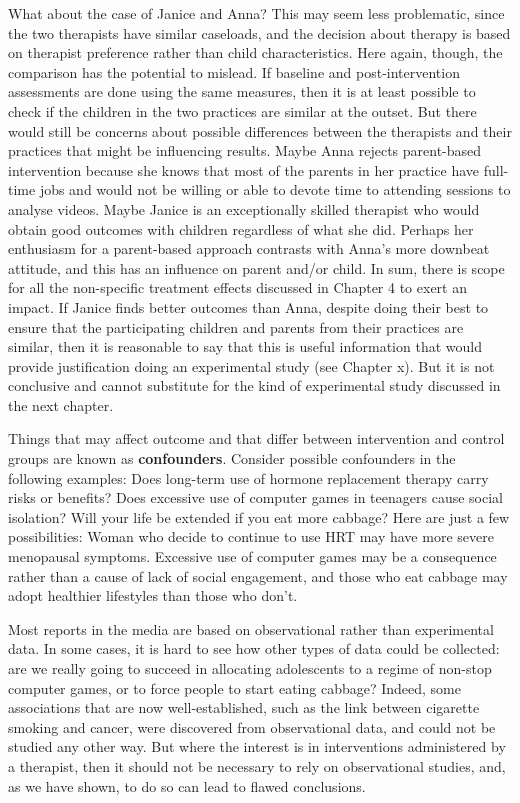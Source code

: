 \documentclass[]{book}
\begin{document}
What about the case of Janice and Anna? This may seem less problematic, since the two therapists have similar caseloads, and the decision about therapy is based on therapist preference rather than child characteristics. Here again, though, the comparison has the potential to mislead. If baseline and post-intervention assessments are done using the same measures, then it is at least possible to check if the children in the two practices are similar at the outset. But there would still be concerns about possible differences between the therapists and their practices that might be influencing results. Maybe Anna rejects parent-based intervention because she knows that most of the parents in her practice have full-time jobs and would not be willing or able to devote time to attending sessions to analyse videos. Maybe Janice is an exceptionally skilled therapist who would obtain good outcomes with children regardless of what she did. Perhaps her enthusiasm for a parent-based approach contrasts with Anna's more downbeat attitude, and this has an influence on parent and/or child. In sum, there is scope for all the non-specific treatment effects discussed in Chapter 4 to exert an impact. If Janice finds better outcomes than Anna, despite doing their best to ensure that the participating children and parents from their practices are similar, then it is reasonable to say that this is useful information that would provide justification doing an experimental study (see Chapter x). But it is not conclusive and cannot substitute for the kind of experimental study discussed in the next chapter.

Things that may affect outcome and that differ between intervention and control groups are known as \textbf{confounders}. Consider possible confounders in the following examples: Does long-term use of hormone replacement therapy carry risks or benefits? Does excessive use of computer games in teenagers cause social isolation? Will your life be extended if you eat more cabbage? Here are just a few possibilities: Woman who decide to continue to use HRT may have more severe menopausal symptoms. Excessive use of computer games may be a consequence rather than a cause of lack of social engagement, and those who eat cabbage may adopt healthier lifestyles than those who don't.

Most reports in the media are based on observational rather than experimental data. In some cases, it is hard to see how other types of data could be collected: are we really going to succeed in allocating adolescents to a regime of non-stop computer games, or to force people to start eating cabbage? Indeed, some associations that are now well-established, such as the link between cigarette smoking and cancer, were discovered from observational data, and could not be studied any other way. But where the interest is in interventions administered by a therapist, then it should not be necessary to rely on observational studies, and, as we have shown, to do so can lead to flawed conclusions.
\end{document}
